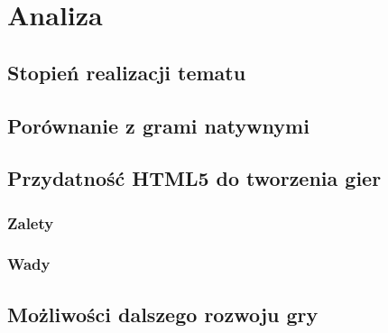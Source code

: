 \chapter{Analiza}
\label{cha:analiza}

\section{Stopień realizacji tematu}
\label{sec:stopieńRealizacji}

\section{Porównanie z grami natywnymi}
\label{sec:porownanieZNatywnymi}

\section{Przydatność HTML5 do tworzenia gier}
\label{sec:przydatność}

\subsection{Zalety}
\label{ssec:zalety}

\subsection{Wady}
\label{ssec:wady}

\section{Możliwości dalszego rozwoju gry}
\label{sec:mozliwosciRozwoju}


